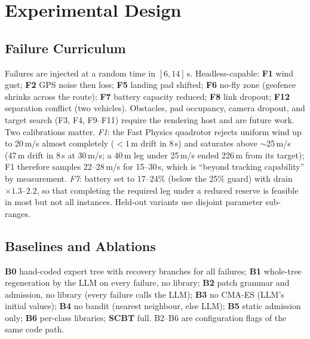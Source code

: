 \documentclass[conference]{IEEEtran}
\begin{document}
\section{Experimental Design}
\label{sec:exp}

\subsection{Failure Curriculum}
\label{sec:curriculum}
Failures are injected at a random time in $[6,14]$\,s. Headless-capable: \textbf{F1} wind gust; \textbf{F2} GPS noise then loss; \textbf{F5} landing pad shifted; \textbf{F6} no-fly zone (geofence shrinks across the route); \textbf{F7} battery capacity reduced; \textbf{F8} link dropout; \textbf{F12} separation conflict (two vehicles). Obstacles, pad occupancy, camera dropout, and target search (F3, F4, F9--F11) require the rendering host and are future work. Two calibrations matter. \emph{F1}: the Fast Physics quadrotor rejects uniform wind up to 20\,m/s almost completely ($<1$\,m drift in 8\,s) and saturates above $\sim$25\,m/s (47\,m drift in 8\,s at 30\,m/s; a 40\,m leg under 25\,m/s ended 226\,m from its target); F1 therefore samples 22--28\,m/s for 15--30\,s, which is ``beyond tracking capability'' by measurement. \emph{F7}: battery set to 17--24\% (below the 25\% guard) with drain $\times 1.3$--$2.2$, so that completing the required leg under a reduced reserve is feasible in most but not all instances. Held-out variants use disjoint parameter sub-ranges.

\subsection{Baselines and Ablations}
\textbf{B0} hand-coded expert tree with recovery branches for all failures; \textbf{B1} whole-tree regeneration by the LLM on every failure, no library; \textbf{B2} patch grammar and admission, no library (every failure calls the LLM); \textbf{B3} no CMA-ES (LLM's initial values); \textbf{B4} no bandit (nearest neighbour, else LLM); \textbf{B5} static admission only; \textbf{B6} per-class libraries; \textbf{SCBT} full. B2--B6 are configuration flags of the same code path.
\end{document}
